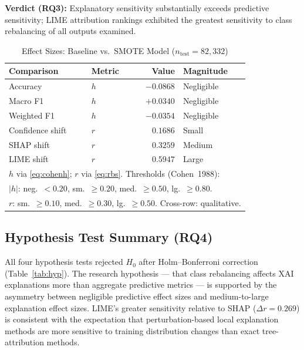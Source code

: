 \documentclass[conference,a4paper]{IEEEtran}
\newcommand{\XAI}{XAI\xspace}
\begin{document}
\smallskip
\noindent\textbf{Verdict (RQ3):} Explanatory sensitivity substantially exceeds
predictive sensitivity; LIME attribution rankings exhibited the greatest
sensitivity to class rebalancing of all outputs examined.

\begin{table}[t]
  \caption{Effect Sizes: Baseline vs.\ SMOTE Model ($n_\text{test}=82{,}332$)}
  \label{tab:effect}
  \centering
  \begin{tabular}{llrl}
    \toprule
    \textbf{Comparison} & \textbf{Metric} & \textbf{Value} & \textbf{Magnitude} \\
    \midrule
    Accuracy         & $h$    & $-0.0868$ & Negligible \\
    Macro F1         & $h$    & $+0.0340$ & Negligible \\
    Weighted F1      & $h$    & $-0.0354$ & Negligible \\
    Confidence shift & $r$    & $0.1686$  & Small \\
    SHAP shift       & $r$    & $0.3259$  & Medium \\
    LIME shift       & $r$    & $0.5947$  & Large \\
    \bottomrule
    \multicolumn{4}{l}{\footnotesize $h$ via \eqref{eq:cohenh}; $r$ via
      \eqref{eq:rbs}. Thresholds (Cohen~1988):}\\
    \multicolumn{4}{l}{\footnotesize $|h|$: neg.\ $<0.20$, sm.\ $\geq0.20$,
      med.\ $\geq0.50$, lg.\ $\geq0.80$.}\\
    \multicolumn{4}{l}{\footnotesize $r$: sm.\ $\geq0.10$, med.\ $\geq0.30$,
      lg.\ $\geq0.50$. Cross-row: qualitative.}\\
  \end{tabular}
\end{table}

\subsection{Hypothesis Test Summary (RQ4)}

All four hypothesis tests rejected $H_0$ after Holm--Bonferroni correction
(Table~\ref{tab:hyp}). The research hypothesis --- that class rebalancing affects
\XAI explanations more than aggregate predictive metrics --- is supported by the
asymmetry between negligible predictive effect sizes and medium-to-large explanation
effect sizes. LIME's greater sensitivity relative to SHAP ($\Delta r=0.269$) is
consistent with the expectation that perturbation-based local explanation methods
are more sensitive to training distribution changes than exact tree-attribution
methods.
\end{document}
